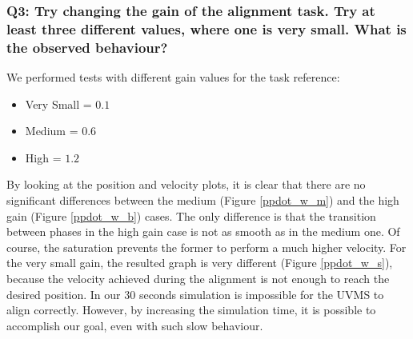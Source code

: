 \documentclass{article}
\begin{document}
\subsubsection{Q3: Try changing the gain of the alignment task. Try at least three different values, where one is very small. What is the observed behaviour?} 
We performed tests with different gain values for the task reference:
\begin{itemize}
 \item Very Small = $0.1$
 \item Medium = $0.6$
 \item High = $1.2$
\end{itemize}
By looking at the position and velocity plots, it is clear that there are no significant differences between the medium (Figure \ref{ppdot_w_m}) and the high gain (Figure \ref{ppdot_w_b}) cases. The only difference is that the transition between phases in the high gain case is not as smooth as in the medium one. Of course, the saturation prevents the former to perform a much higher velocity. 
For the very small gain, the resulted graph is very different (Figure \ref{ppdot_w_s}), because the velocity achieved during the alignment is not enough to reach the desired position. In our 30 seconds simulation is impossible for the UVMS to align correctly. However, by increasing the simulation time, it is possible to accomplish our goal, even with such slow behaviour.
\end{document}
